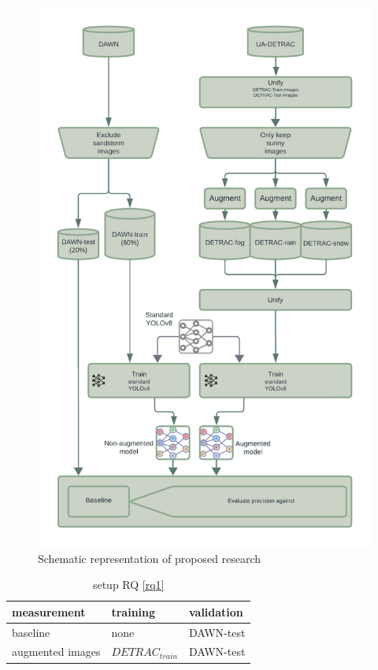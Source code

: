 \documentclass[]{article}
\begin{document}
	\begin{figure}[H]
		\centering
		\includegraphics[scale=0.21]{Proposal_diagram.png}
		\caption{Schematic representation of proposed research}
		\label{fig:experiment_process}
	\end{figure}
	

	\begin{table}[!ht]
		\centering
		\begin{tabular}{lll}
			\toprule
			\textbf{measurement} & \textbf{training} & \textbf{validation} \\
			\midrule
			baseline & none & DAWN-test \\
			augmented images & $DETRAC_{train}$ & DAWN-test \\
			\bottomrule
		\end{tabular}
		\caption{setup RQ \ref{rq1}}
		\label{table:setuprq1}
	\end{table}
\end{document}
